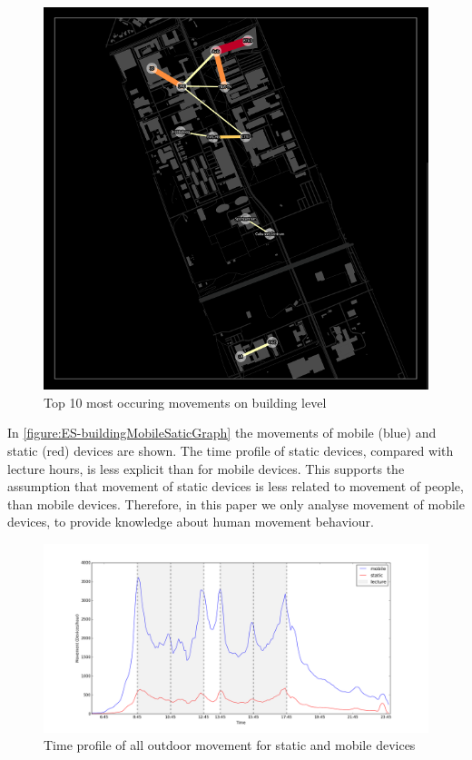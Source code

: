 \begin{figure}[H]
\centering
\includegraphics[scale=0.1]{ES-mapTotal.png}
\captionsetup{justification=centering}
\caption{Top 10 most occuring movements on building level}
\label{figure:ES-mapTotal}
\end{figure}

In \autoref{figure:ES-buildingMobileSaticGraph} the movements of mobile (blue) and static (red) devices are shown. The time profile of static devices, compared with lecture hours, is less explicit than for mobile devices. This supports the assumption that movement of static devices is less related to movement of people, than mobile devices. Therefore, in this paper we only analyse movement of mobile devices, to provide knowledge about human movement behaviour.

\begin{figure}[H]
\centering
\includegraphics[scale=0.2]{building_mobileStatic_graph.png}
\captionsetup{justification=centering}
\caption{Time profile of all outdoor movement for static and mobile devices}
\label{figure:ES-buildingMobileSaticGraph}
\end{figure}

